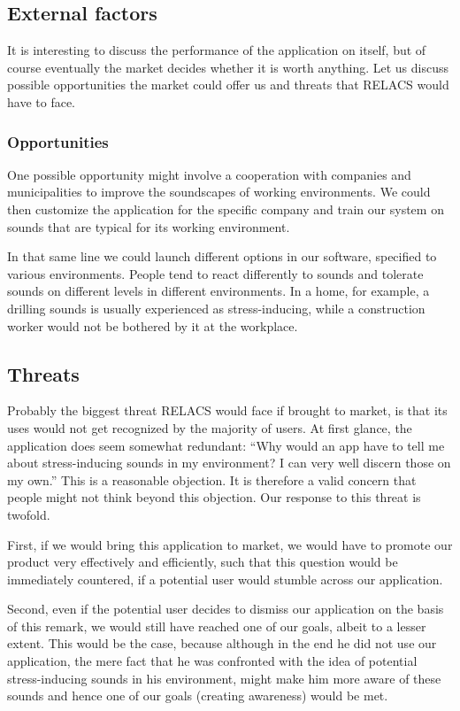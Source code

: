 \documentclass[a4paper]{article}
\begin{document}
\subsection{External factors}
It is interesting to discuss the performance of the application on itself, but of course eventually the market decides whether it is worth anything.
Let us discuss possible opportunities the market could offer us and threats that RELACS would have to face.

\subsubsection{Opportunities}
One possible opportunity might involve a cooperation with companies and municipalities to improve the soundscapes of working environments.
We could then customize the application for the specific company and train our system on sounds that are typical for its working environment.

In that same line we could launch different options in our software, specified to various environments.
People tend to react differently to sounds and tolerate sounds on different levels in different environments.
In a home, for example, a drilling sounds is usually experienced as stress-inducing, while a construction worker would not be bothered by it at the workplace. 

\subsection{Threats}
Probably the biggest threat RELACS would face if brought to market, is that its uses would not get recognized by the majority of users.
At first glance, the application does seem somewhat redundant: ``Why would an app have to tell me about stress-inducing sounds in my environment? I can very well discern those on my own.''
This is a reasonable objection.
It is therefore a valid concern that people might not think beyond this objection.
Our response to this threat is twofold.

First, if we would bring this application to market, we would have to promote our product very effectively and efficiently,
such that this question would be immediately countered, if a potential user would stumble across our application. 

Second, even if the potential user decides to dismiss our application on the basis of this remark, we would still have reached one of our goals, albeit to a lesser extent.
This would be the case, because although in the end he did not use our application,
the mere fact that he was confronted with the idea of potential stress-inducing sounds in his environment, might make him more aware of these sounds and hence one of our goals (creating awareness) would be met.
\end{document}
